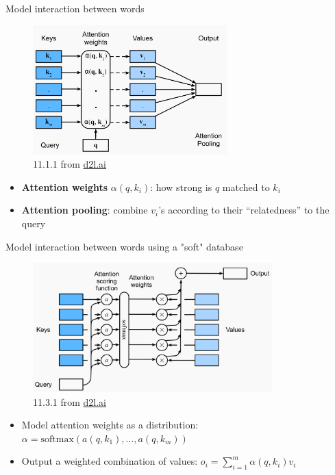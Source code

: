 \documentclass[usenames,dvipsnames,notes,11pt,aspectratio=169,hyperref={colorlinks=true, linkcolor=blue}]{beamer}
\begin{document}
\begin{frame}
    {Model interaction between words}
    \begin{figure}
        \includegraphics[height=5cm]{figures/qkv}
        \caption{11.1.1 from \href{https://d2l.ai/chapter_attention-mechanisms-and-transformers/queries-keys-values.html}{d2l.ai}}
    \end{figure}
    \vspace{-1em}
    \begin{itemize}
        \item \textbf{Attention weights} $\alpha(q, k_i)$: how strong is $q$ matched to $k_i$
        \item \textbf{Attention pooling}: combine $v_i$'s according to their ``relatedness'' to the query
    \end{itemize}
\end{frame}

\begin{frame}
    {Model interaction between words using a "soft" database}
    \begin{figure}
        \includegraphics[height=5cm]{figures/qkv-2}
        \caption{11.3.1 from \href{https://d2l.ai/chapter_attention-mechanisms-and-transformers/attention-scoring-functions.html}{d2l.ai}}
    \end{figure}
    \vspace{-1em}
    \begin{itemize}
        \item Model {attention weights} as a distribution: $\alpha=\mathrm{softmax}(a(q,k_1),\ldots,a(q,k_m))$
        \item Output a weighted combination of values: $o_i = \sum_{i=1}^m \alpha(q,k_i) v_i$
    \end{itemize}
\end{frame}
\end{document}
